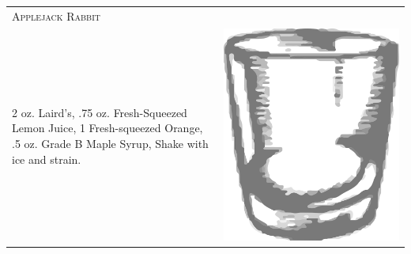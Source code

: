 \documentclass{article}
\begin{document}
\begin{tabular}{p{2in} p{0.5in}}
\multicolumn{2}{p{3in}}{\centering\Huge\textsc{Applejack Rabbit}} \\
  \vspace{-0.1in}2 oz. Laird's, .75 oz. Fresh-Squeezed Lemon Juice, 1 Fresh-squeezed Orange, .5 oz. Grade B Maple Syrup, Shake with ice and strain.&
  \vspace{-0.1in} \includegraphics{rocks_glass.png}
\end{tabular}
\end{document}
